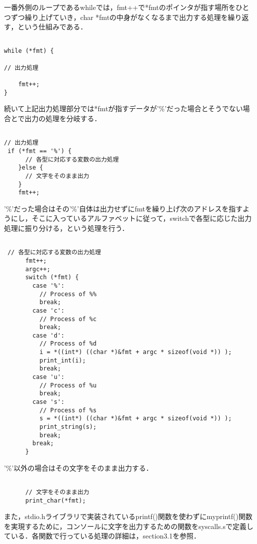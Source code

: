 \documentclass[a4j]{jarticle}
\begin{document}
一番外側のループであるwhileでは，fmt++で*fmtのポインタが指す場所をひとつずつ繰り上げていき，char *fmtの中身がなくなるまで出力する処理を繰り返す，という仕組みである．

{\baselineskip 3mm
  \begin{verbatim}

while (*fmt) {

// 出力処理

    fmt++;
}

\end{verbatim}
}

続いて上記出力処理部分では*fmtが指すデータが'\%'だった場合とそうでない場合とで出力の処理を分岐する．

{\baselineskip 3mm
  \begin{verbatim}

// 出力処理
 if (*fmt == '%') {
      // 各型に対応する変数の出力処理
    }else {
      // 文字をそのまま出力
    }
    fmt++;

\end{verbatim}
}

'\%'だった場合はその'\%'自体は出力せずにfmtを繰り上げ次のアドレスを指すようにし，そこに入っているアルファベットに従って，switchで各型に応じた出力処理に振り分ける，という処理を行う．

{\baselineskip 3mm
  \begin{verbatim}

 // 各型に対応する変数の出力処理
      fmt++;
      argc++;
      switch (*fmt) {
        case '%':
          // Process of %%
          break;
        case 'c':
          // Process of %c
          break;
        case 'd':
          // Process of %d
          i = *((int*) ((char *)&fmt + argc * sizeof(void *)) );
          print_int(i);
          break;
        case 'u':
          // Process of %u
          break;
        case 's':
          // Process of %s
          s = *((int*) ((char *)&fmt + argc * sizeof(void *)) );
          print_string(s);
          break;
        break;
      }

\end{verbatim}
}

'\%'以外の場合はその文字をそのまま出力する．

{\baselineskip 3mm
  \begin{verbatim}

      // 文字をそのまま出力 
      print_char(*fmt);

\end{verbatim}
}


また，stdio.hライブラリで実装されているprintf()関数を使わずにmyprintf()関数を実現するために，コンソールに文字を出力するための関数をsyscalls.sで定義している．各関数で行っている処理の詳細は，section3.1を参照． 
\end{document}
